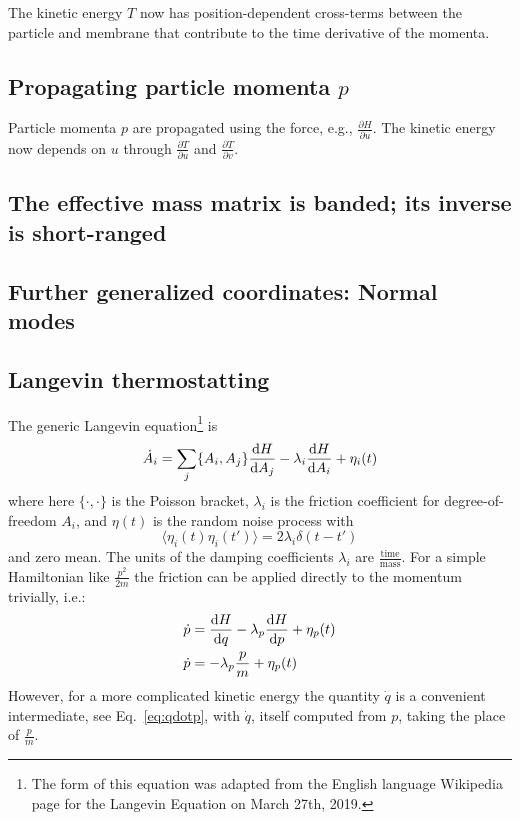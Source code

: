 The kinetic energy $T$ now has position-dependent cross-terms between the particle and membrane that contribute to the time derivative of the momenta.

\subsection{Propagating particle momenta $p$ }

Particle momenta $p$ are propagated using the force, e.g., $\frac{\partial{H}}{\partial{u}}$.
The kinetic energy now depends on $u$ through $\frac{\partial T}{\partial u}$ and $\frac{\partial T}{\partial v}$.

\subsection{The effective mass matrix is banded; its inverse is short-ranged }


\subsection{Further generalized coordinates: Normal modes }

\subsection{Langevin thermostatting}

The generic Langevin equation\footnote{The form of this equation was adapted from the English language Wikipedia page for the Langevin Equation on March 27th, 2019.}
is
\begin{equation}
\dot{A}_i = \sum_j \{ A_i, A_j \} \frac{\textrm{d} H}{\textrm{d} A_j} - \lambda_i \frac{\textrm{d} H}{\textrm{d} A_i} + \eta_i(t)
\end{equation}
where here $\{ \cdot, \cdot \}$ is the Poisson bracket, $\lambda_i$ is the friction coefficient for degree-of-freedom $A_i$, and $\eta(t)$ is the random noise process with
\begin{equation}
\langle \eta_i(t) \eta_i(t') \rangle = 2 \lambda_i \delta(t-t')
\end{equation}
and zero mean.
The units of the damping coefficients $\lambda_i$ are $\frac{\textrm{time}}{\textrm{mass}}$.
For a simple Hamiltonian like $\frac{p^2}{2 m}$ the friction can be applied directly to the momentum trivially, i.e.:
\begin{align}
\dot{p} &= \frac{\textrm{d} H}{\textrm{d} q} - \lambda_p \frac{\textrm{d} H}{\textrm{d} p} + \eta_p(t) \\
\dot{p} &= - \lambda_p \frac{p}{m} + \eta_p(t) 
\end{align}
However, for a more complicated kinetic energy the quantity $\dot{q}$ is a convenient intermediate, see Eq.~\ref{eq:qdotp}, with $\dot{q}$, itself computed from $p$, taking the place of $\frac{p}{m}$. 


%
%
%



